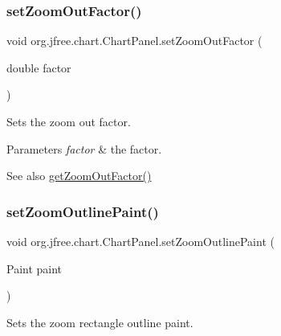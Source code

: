 \subsubsection{\texorpdfstring{set\+Zoom\+Out\+Factor()}{setZoomOutFactor()}}
{\footnotesize\ttfamily void org.\+jfree.\+chart.\+Chart\+Panel.\+set\+Zoom\+Out\+Factor (\begin{DoxyParamCaption}\item[{double}]{factor }\end{DoxyParamCaption})}

Sets the zoom out factor.


\begin{DoxyParams}{Parameters}
{\em factor} & the factor.\\
\hline
\end{DoxyParams}
\begin{DoxySeeAlso}{See also}
\mbox{\hyperlink{classorg_1_1jfree_1_1chart_1_1_chart_panel_a5cd5ea564c46614edff846c7c0afbb9d}{get\+Zoom\+Out\+Factor()}} 
\end{DoxySeeAlso}
\mbox{\label{classorg_1_1jfree_1_1chart_1_1_chart_panel_a5b5c5e86abd33a1ac75f62b786f41d6a}} 
\subsubsection{\texorpdfstring{set\+Zoom\+Outline\+Paint()}{setZoomOutlinePaint()}}
{\footnotesize\ttfamily void org.\+jfree.\+chart.\+Chart\+Panel.\+set\+Zoom\+Outline\+Paint (\begin{DoxyParamCaption}\item[{Paint}]{paint }\end{DoxyParamCaption})}

Sets the zoom rectangle outline paint.



